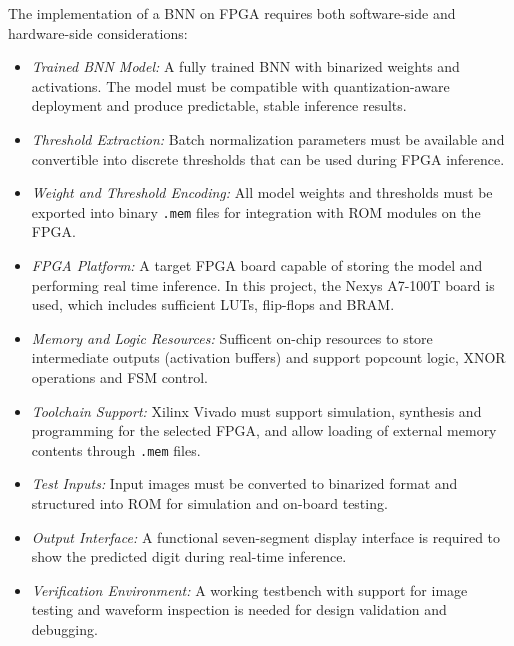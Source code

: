 \documentclass[a4paper,12pt]{report}
\begin{document}
The implementation of a BNN on FPGA requires both software-side and hardware-side considerations:
\begin{itemize}
    \item \textit{Trained BNN Model:} A fully trained BNN with binarized weights and activations. The model must be compatible with quantization-aware deployment and produce predictable, stable inference results.
    
    \item \textit{Threshold Extraction:} Batch normalization parameters must be available and convertible into discrete thresholds that can be used during FPGA inference.

    \item \textit{Weight and Threshold Encoding:} All model weights and thresholds must be exported into binary \texttt{.mem} files for integration with ROM modules on the FPGA.

    \item \textit{FPGA Platform:} A target FPGA board capable of storing the model and performing real time inference. In this project, the Nexys A7-100T board is used, which includes sufficient LUTs, flip-flops and BRAM.

    \item \textit{Memory and Logic Resources:} Sufficent on-chip resources to store intermediate outputs (activation buffers) and support popcount logic, XNOR operations and FSM control.

    \item \textit{Toolchain Support:} Xilinx Vivado must support simulation, synthesis and programming for the selected FPGA, and allow loading of external memory contents through \texttt{.mem} files.

    \item \textit{Test Inputs:} Input images must be converted to binarized format and structured into ROM for simulation and on-board testing.

    \item \textit{Output Interface:} A functional seven-segment display interface is required to show the predicted digit during real-time inference.

    \item \textit{Verification Environment:} A working testbench with support for image testing and waveform inspection is needed for design validation and debugging.
\end{itemize}


\clearpage
\end{document}
